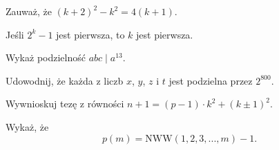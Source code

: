 
\begin{hints_list}
	\item Zauważ, że $(k + 2)^2 - k^2 = 4(k + 1)$. 
	\item Jeśli $2^k - 1$ jest pierwsza, to $k$ jest pierwsza.
	\item Wykaż podzielność $abc \mid a^{13}$.
	\item Udowodnij, że każda z liczb $x$, $y$, $z$ i $t$ jest podzielna przez $2^{800}$.
	\item Wywnioskuj tezę z równości $n + 1 = (p - 1) \cdot k^2 + (k \pm 1)^2$.
	\item Wykaż, że
	\[
		p(m) = \mathrm{NWW}(1, 2, 3, ..., m) - 1.
	\]
\end{hints_list}